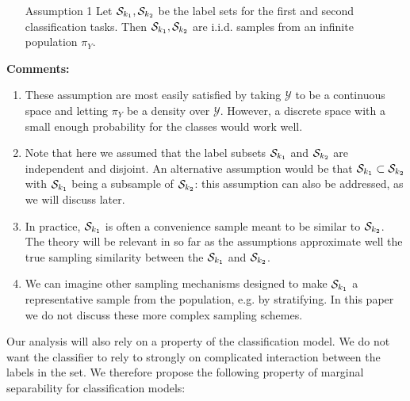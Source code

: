 \documentclass[12pt]{article}
\begin{document}
\begin{itemize}
\item[Assumption 1] Let $\mathcal{S}_{k_1}, \mathcal{S}_{k_2}$ be the label sets
for the first and second classification tasks. Then $\mathcal{S}_{k_1}, 
\mathcal{S}_{k_2}$ are i.i.d. samples from an infinite population $\pi_Y$.
\end{itemize}


\textbf{Comments:}
\begin{enumerate}
\item These assumption are most easily satisfied by taking $\mathcal{Y}$ 
to be a continuous space and letting $\pi_Y$ be a density over $\mathcal{Y}$. However, a discrete space with a small enough 
probability for the classes would work well. 
\item Note that here we assumed that the label subsets $\mathcal{S}_{k_1}$ and
$\mathcal{S}_{k_2}$ are independent and disjoint. An alternative
assumption would be that $\mathcal{S}_{k_1} \subset
\mathcal{S}_{k_2}$ with $\mathcal{S}_{k_1}$ being a subsample of
$\mathcal{S}_{k_2}$: this assumption can also be addressed, as we will
discuss later.
\item 
In practice, $\mathcal{S}_{k_1}$ is often a convenience sample meant to be
similar to $\mathcal{S}_{k_2}$. The theory will be relevant in so far as the
assumptions approximate well the true sampling similarity between the
$\mathcal{S}_{k_1}$ and $\mathcal{S}_{k_2}$.
\item We can imagine other sampling mechanisms designed to make $\mathcal{S}_{k_1}$ a representative sample from the population, e.g. by stratifying. In this paper we do not discuss these more complex sampling schemes. 
\end{enumerate}


Our analysis will also rely on a property of the classification
model. We do not want the classifier to rely to strongly on
complicated interaction between the labels in the set. We therefore
propose the following property of marginal separability for
classification models:
\end{document}
